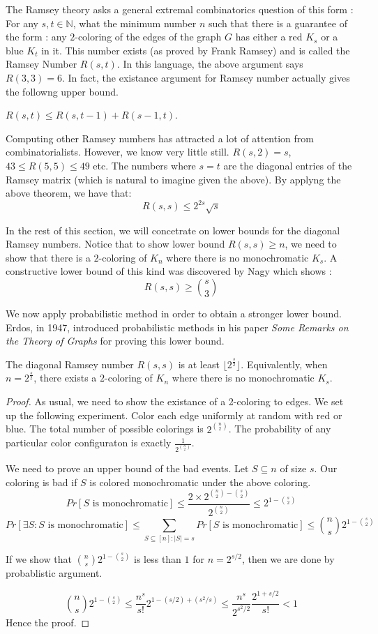 \noindent The Ramsey theory asks a general extremal combinatorics question of this form : For any $s,t \in \mathbb{N}$, what the minimum number $n$ such that there is a guarantee of the form : any $2$-coloring of the edges of the graph $G$ has either a red $K_s$ or a blue $K_t$ in it. This number exists (as proved by Frank Ramsey) and is called the Ramsey Number $R(s,t)$.
In this language, the above argument says $R(3,3) = 6$.
In fact, the existance argument for Ramsey number actually gives the followng upper bound.
\begin{proposition}
$R(s,t) \le R(s,t-1)+R(s-1,t)$.
\end{proposition}

Computing other Ramsey numbers has attracted a lot of attention from combinatorialists. However, we know very little still. $R(s,2)=s$, $43 \le R(5,5) \le 49$ etc. The numbers where $s=t$ are the diagonal entries of the Ramsey matrix (which is natural to imagine given the above). By applyng the above theorem, we have that: $$R(s,s) \le 2^{2s}\sqrt{s}$$

In the rest of this section, we will concetrate on  lower bounds for the diagonal Ramsey numbers. Notice that to show lower bound $R(s,s) \ge n$, we need to show that there is a $2$-coloring of $K_n$ where there is no monochromatic $K_s$. A constructive lower bound of this kind was discovered by Nagy which shows :
$$R(s,s) \ge {s \choose 3}$$

We now apply probabilistic method in order to obtain a stronger lower bound. Erdos, in 1947, introduced
probabilistic methods in his paper {\em Some Remarks on the Theory of Graphs} for proving this lower bound.

\begin{theorem}
The diagonal Ramsey number $R(s,s)$ is at least $\lfloor 2^{\frac{s}{2}}\rfloor$.
Equivalently, when $n=2^{\frac{s}{2}}$, there exists a $2$-coloring of $K_n$ where there is no monochromatic $K_s$.
\end{theorem}
\begin{proof}
As usual, we need to show the existance of a 2-coloring to edges. We set up the following experiment. Color each edge uniformly at random with red or blue. The total number of possible colorings is $2^{n \choose 2}$. The probability of any particular color configuraton is exactly $\frac{1}{2^{n \choose 2}}$.

We need to prove an upper bound of the bad events. Let $S \subseteq n$ of size $s$. Our coloring is bad if $S$ is colored monochromatic under the above coloring.
$$Pr[\textrm{$S$ is monochromatic}] \le \frac{2 \times 2^{{n \choose 2}-{s \choose 2}}}{2^{n \choose 2}} \le 2^{1-{s \choose 2}}$$
$$Pr[\textrm{$\exists S : S$ is monochromatic}] \le
\sum_{S \subseteq [n]:|S|=s} Pr[\textrm{$S$ is monochromatic}] \le {n \choose s}2^{1-{s \choose 2}}$$

If we show that ${n \choose s}2^{1-{s \choose 2}}$ is less than $1$ for $n=2^{s/2}$, then we are done by probablistic argument.

$$
{n \choose s}2^{1-{s \choose 2}} 
\le \frac{n^s}{s!}2^{1-(s/2)+(s^2/s)} 
\le \frac{n^s}{2^{s^2/2}}\frac{2^{1+s/2}}{s!}<1
$$
Hence the proof.
\end{proof}

